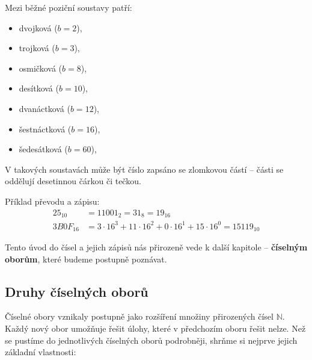 \documentclass[12pt,a4paper]{article}
\begin{document}
Mezi běžné poziční soustavy patří: 
      \begin{itemize}
         \item dvojková (\(b=2\)), 
         \item trojková (\(b=3\)),
         \item osmičková (\(b=8\)), 
         \item desítková (\(b=10\)), 
         \item dvanáctková (\(b=12\)), 
         \item šestnáctková (\(b=16\)), 
         \item šedesátková (\(b=60\)),  
      \end{itemize}
V takových soustavách může být číslo zapsáno se zlomkovou částí – části se oddělují desetinnou čárkou či tečkou.  


\begin{examplebox}
Příklad převodu a zápisu:
\begin{align*}
25_{10} &= 11001_2 = 31_8 = 19_{16} \\
3B0F_{16} &= 3 \cdot 16^3 + 11 \cdot 16^2 + 0 \cdot 16^1 + 15 \cdot 16^0 = 15119_{10}
\end{align*}
\end{examplebox}

Tento úvod do čísel a jejich zápisů nás přirozeně vede k další kapitole –
\textbf{číselným oborům}, které budeme postupně poznávat.

\newpage
\subsection{Druhy číselných oborů}

Číselné obory vznikaly postupně jako rozšíření množiny přirozených čísel $\mathbb{N}$.
Každý nový obor umožňuje řešit úlohy, které v předchozím oboru řešit nelze.
Než se pustíme do jednotlivých číselných oborů podrobněji, shrňme si nejprve jejich základní vlastnosti:
\end{document}
